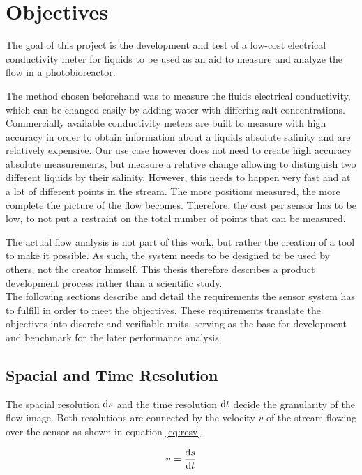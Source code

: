 \chapter{Objectives}

The goal of this project is the development and test of a low-cost electrical conductivity meter for liquids to be used as an aid to measure and analyze the flow in a photobioreactor.

The method chosen beforehand was to measure the fluids electrical conductivity, which can be changed easily by adding water with differing salt concentrations. Commercially available conductivity meters are built to measure with high accuracy in order to obtain information about a liquids absolute salinity and are relatively expensive. Our use case however does not need to create high accuracy absolute measurements, but measure a relative change allowing to distinguish two different liquids by their salinity. However, this needs to happen very fast and at a lot of different points in the stream. The more positions measured, the more complete the picture of the flow becomes. Therefore, the cost per sensor has to be low, to not put a restraint on the total number of points that can be measured.

The actual flow analysis is not part of this work, but rather the creation of a tool to make it possible. As such, the system needs to be designed to be used by others, not the creator himself. This thesis therefore describes a product development process rather than a scientific study. \\

The following sections describe and detail the requirements the sensor system has to fulfill in order to meet the objectives. These requirements translate the objectives into discrete and verifiable units, serving as the base for development and benchmark for the later performance analysis. 

\section{Spacial and Time Resolution}

The spacial resolution $ \mathop{}\!\mathrm{d} s $ and the time resolution $ \mathop{}\!\mathrm{d} t $ decide the granularity of the flow image. Both resolutions are connected by the velocity $ v $ of the stream flowing over the sensor as shown in equation \eqref{eq:resv}.

\begin{equation}
	v = \dfrac{\mathop{}\!\mathrm{d} s}{\mathop{}\!\mathrm{d} t}
\label{eq:resv} 
\end{equation}

